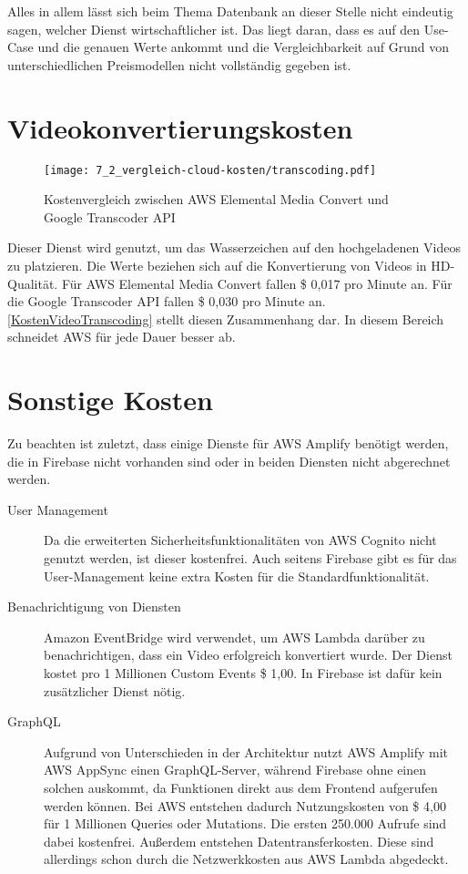 Alles in allem lässt sich beim Thema Datenbank an dieser Stelle nicht eindeutig sagen, welcher Dienst wirtschaftlicher ist. Das liegt daran, dass es auf den Use-Case und die genauen Werte ankommt und die Vergleichbarkeit auf Grund von unterschiedlichen Preismodellen nicht vollständig gegeben ist.

\section{Videokonvertierungskosten}

\begin{figure}
  \centering
  \texttt{[image: 7\_2\_vergleich-cloud-kosten/transcoding.pdf]}
  \caption{Kostenvergleich zwischen AWS Elemental Media Convert und Google Transcoder API}
  \label{KostenVideoTranscoding}
\end{figure}

Dieser Dienst wird genutzt, um das Wasserzeichen auf den hochgeladenen Videos zu platzieren. Die Werte beziehen sich auf die Konvertierung von Videos in HD-Qualität. Für \ac{AWS} Elemental Media Convert fallen \$ 0,017 pro Minute an. Für die Google Transcoder API fallen \$ 0,030 pro Minute an. \autoref{KostenVideoTranscoding} stellt diesen Zusammenhang dar. In diesem Bereich schneidet \ac{AWS} für jede Dauer besser ab.

\section{Sonstige Kosten}

Zu beachten ist zuletzt, dass einige Dienste für \ac{AWS} Amplify benötigt werden, die in Firebase nicht vorhanden sind oder in beiden Diensten nicht abgerechnet werden.
\begin{description}
\item[User Management] Da die erweiterten Sicherheitsfunktionalitäten von \ac{AWS} Cognito nicht genutzt werden, ist dieser kostenfrei. Auch seitens Firebase gibt es für das User-Management keine extra Kosten für die Standardfunktionalität.
\item[Benachrichtigung von Diensten] Amazon EventBridge wird verwendet, um \ac{AWS} Lambda darüber zu benachrichtigen, dass ein Video erfolgreich konvertiert wurde. Der Dienst kostet pro 1 Millionen Custom Events \$ 1,00. In Firebase ist dafür kein zusätzlicher Dienst nötig.
\item[GraphQL] Aufgrund von Unterschieden in der Architektur nutzt \ac{AWS} Amplify mit AWS AppSync einen GraphQL-Server, während Firebase ohne einen solchen auskommt, da Funktionen direkt aus dem Frontend aufgerufen werden können. Bei \ac{AWS} entstehen dadurch Nutzungskosten von \$ 4,00 für 1 Millionen Queries oder Mutations. Die ersten 250.000 Aufrufe sind dabei kostenfrei. Außerdem entstehen Datentransferkosten. Diese sind allerdings schon durch die Netzwerkkosten aus \ac{AWS} Lambda abgedeckt.
\end{description}

